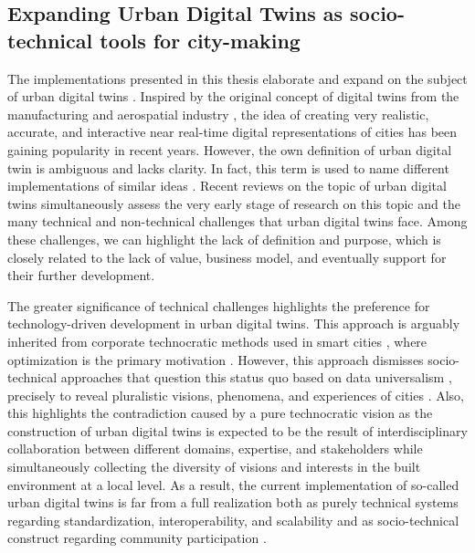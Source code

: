 \subsection{Expanding Urban Digital Twins as socio-technical tools for city-making}

The implementations presented in this thesis elaborate and expand on the subject of urban digital twins \citep{Batty2018, Ferre-Bigorra2022TheTwins}. Inspired by the original concept of digital twins from the manufacturing and aerospatial industry \citep{Grieves2014, Shafto2012}, the idea of creating very realistic, accurate, and interactive near real-time digital representations of cities has been gaining popularity in recent years. However, the own definition of urban digital twin is ambiguous and lacks clarity. In fact, this term is used to name different implementations of similar ideas \citep{Depretre2022, Shahat2021}. Recent reviews on the topic of urban digital twins simultaneously assess the very early stage of research on this topic and the many technical and non-technical challenges that urban digital twins face. Among these challenges, we can highlight the lack of definition and purpose, which is closely related to the lack of value, business model, and eventually support for their further development. 

The greater significance of technical challenges highlights the preference for technology-driven development in urban digital twins. This approach is arguably inherited from corporate technocratic methods used in smart cities \citep{Cardullo2019}, where optimization is the primary motivation \citep{Kitchin2016}. However, this approach dismisses socio-technical approaches that question this status quo based on data universalism \citep{Loukissas2019}, precisely to reveal pluralistic visions, phenomena, and experiences of cities \citep{Charitonidou2022}. 
Also, this highlights the contradiction caused by a pure technocratic vision as the construction of urban digital twins is expected to be the result of interdisciplinary collaboration between different domains, expertise, and stakeholders while simultaneously collecting the diversity of visions and interests in the built environment at a local level.
As a result, the current implementation of so-called urban digital twins is far from a full realization both as purely technical systems regarding standardization, interoperability, and scalability \citep{Cheng2022, Shahat2021} and as socio-technical construct regarding community participation \citep{Axelsson2018}.

